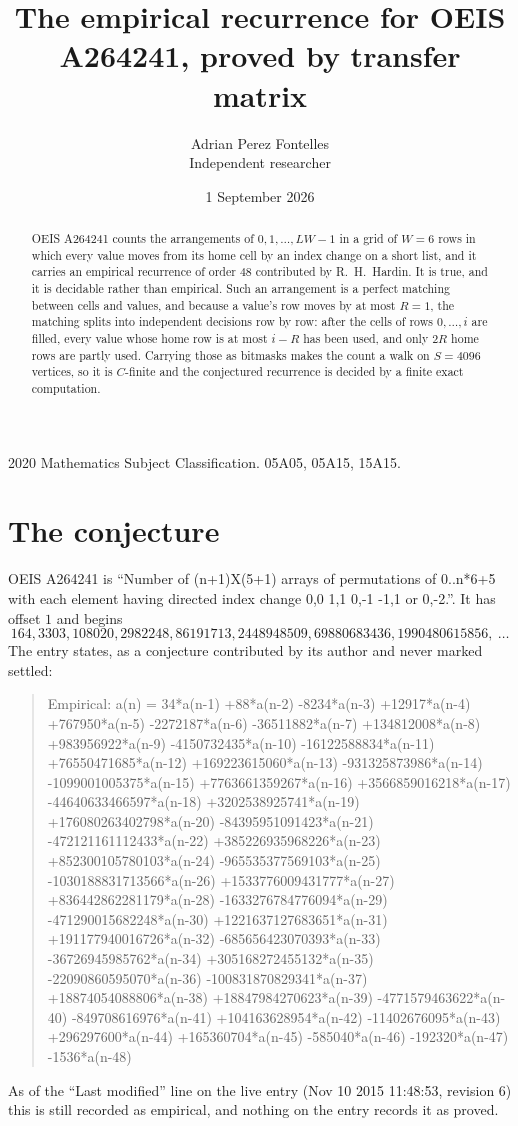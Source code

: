 \documentclass[11pt,a4paper]{article}
\title{The empirical recurrence for OEIS A264241, proved by transfer matrix}
\author{Adrian Perez Fontelles\\ \small Independent researcher}
\date{1 September 2026}
\theoremstyle{plain}
\theoremstyle{definition}
\begin{document}
\maketitle

\begin{abstract}
OEIS A264241 counts the arrangements of $0,1,\dots,LW-1$ in a grid of $W=6$ rows in which
every value moves from its home cell by an index change on a short list, and it carries an
empirical recurrence of order $48$ contributed by R.~H.~Hardin. It is true, and it is
decidable rather than empirical. Such an arrangement is a perfect matching between cells and
values, and because a value's row moves by at most $R=1$, the matching splits into
independent decisions row by row: after the cells of rows $0,\dots,i$ are filled,
every value whose home row is at most $i-R$ has been used, and only $2R$ home rows are
partly used. Carrying those as bitmasks makes the count a walk on $S=4096$ vertices, so it is
$C$-finite and the conjectured recurrence is decided by a finite exact computation.
\end{abstract}

\noindent\small 2020 Mathematics Subject Classification. 05A05, 05A15, 15A15.\normalsize

\section{The conjecture}

OEIS A264241 is ``Number of (n+1)X(5+1) arrays of permutations of 0..n*6+5 with each element having directed index change 0,0 1,1 0,-1 -1,1 or 0,-2.''. It has offset $1$ and begins
\[
164, 3303, 108020, 2982248, 86191713, 2448948509, 69880683436, 1990480615856,\ \dots
\]
The entry states, as a conjecture contributed by its author and never marked settled:
\begin{quote}
Empirical: a(n) = 34*a(n-1) +88*a(n-2) -8234*a(n-3) +12917*a(n-4) +767950*a(n-5) -2272187*a(n-6) -36511882*a(n-7) +134812008*a(n-8) +983956922*a(n-9) -4150732435*a(n-10) -16122588834*a(n-11) +76550471685*a(n-12) +169223615060*a(n-13) -931325873986*a(n-14) -1099001005375*a(n-15) +7763661359267*a(n-16) +3566859016218*a(n-17) -44640633466597*a(n-18) +3202538925741*a(n-19) +176080263402798*a(n-20) -84395951091423*a(n-21) -472121161112433*a(n-22) +385226935968226*a(n-23) +852300105780103*a(n-24) -965535377569103*a(n-25) -1030188831713566*a(n-26) +1533776009431777*a(n-27) +836442862281179*a(n-28) -1633276784776094*a(n-29) -471290015682248*a(n-30) +1221637127683651*a(n-31) +191177940016726*a(n-32) -685656423070393*a(n-33) -36726945985762*a(n-34) +305168272455132*a(n-35) -22090860595070*a(n-36) -100831870829341*a(n-37) +18874054088806*a(n-38) +18847984270623*a(n-39) -4771579463622*a(n-40) -849708616976*a(n-41) +104163628954*a(n-42) -11402676095*a(n-43) +296297600*a(n-44) +165360704*a(n-45) -585040*a(n-46) -192320*a(n-47) -1536*a(n-48)
\end{quote}
As of the ``Last modified'' line on the live entry (Nov 10 2015 11:48:53, revision 6) this is still
recorded as empirical, and nothing on the entry records it as proved.
\end{document}
